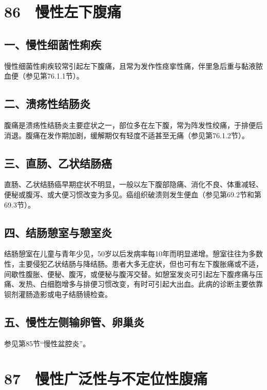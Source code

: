 \protect\hypertarget{text00209.html}{}{}

\section{86　慢性左下腹痛}

\subsection{一、慢性细菌性痢疾}

慢性细菌性痢疾较常引起左下腹痛，且常为发作性痉挛性痛，伴里急后重与黏液脓血便（参见第76.1.1节）。

\subsection{二、溃疡性结肠炎}

腹痛是溃疡性结肠炎主要症状之一，部位多在左下腹，常为阵发性绞痛，于排便后消退。腹痛在发作期加剧，缓解期仅有轻度不适甚至无痛（参见第76.1.2节）。

\subsection{三、直肠、乙状结肠癌}

直肠、乙状结肠癌早期症状不明显，一般以左下腹部隐痛、消化不良、体重减轻、便秘或腹泻、或大便习惯改变为多见。癌组织破溃则发生便血（参见第69.2节和第69.3节）。

\subsection{四、结肠憩室与憩室炎}

结肠憩室在儿童与青年少见，50岁以后发病率每10年而明显递增。憩室往往为多数性，主要侵犯乙状结肠与降结肠。患者大多无症状，但也可有左下腹胀痛或不适，间歇性腹胀、便秘、腹泻，或便秘与腹泻交替。如憩室发炎可引起左下腹疼痛与压痛、发热、白细胞增多与排便习惯改变，有时可引起大出血。此病的诊断主要依靠钡剂灌肠造影或电子结肠镜检查。

\subsection{五、慢性左侧输卵管、卵巢炎}

参见第85节“慢性盆腔炎”。

\protect\hypertarget{text00210.html}{}{}

\section{87　慢性广泛性与不定位性腹痛}

